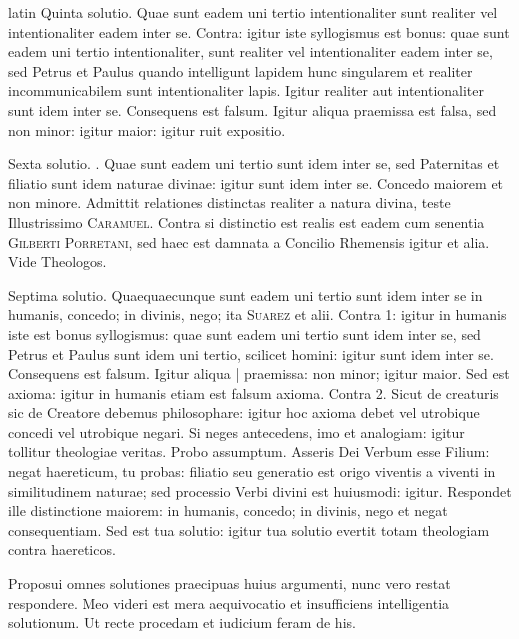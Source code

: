 \begin{otherlanguage*}{latin}
\pstart
 Quinta solutio. Quae sunt eadem uni tertio intentionaliter sunt realiter vel intentionaliter eadem inter se. Contra: igitur iste syllogismus est bonus: quae sunt eadem uni tertio intentionaliter, sunt realiter vel intentionaliter eadem inter se, sed Petrus et Paulus quando intelligunt lapidem hunc singularem et realiter incommunicabilem sunt intentionaliter lapis. Igitur realiter aut intentionaliter sunt idem inter se. Consequens est falsum. Igitur aliqua praemissa est falsa, sed non minor: igitur maior: igitur ruit expositio. 
\pend

\pstart
 Sexta solutio. . Quae sunt eadem uni tertio sunt idem inter se, sed Paternitas et filiatio sunt idem naturae divinae: igitur sunt idem inter se. Concedo maiorem et non minore. Admittit relationes distinctas realiter a natura divina, teste Illustrissimo \textsc{Caramuel}. Contra si distinctio est realis est eadem cum senentia \textsc{Gilberti Porretani}, sed haec est damnata a Concilio Rhemensis igitur et alia. Vide Theologos. 
\pend

\pstart
 Septima solutio. Quaequaecunque sunt eadem uni tertio sunt idem inter se in humanis, concedo; in divinis, nego; ita \textsc{Suarez} et alii. Contra 1: igitur in humanis iste est bonus syllogismus: quae sunt eadem uni tertio sunt idem inter se, sed Petrus et Paulus sunt idem uni tertio, scilicet homini: igitur sunt idem inter se. Consequens est falsum. Igitur aliqua \textnormal{|} praemissa: non minor; igitur maior. Sed est axioma: igitur in humanis etiam est falsum axioma. Contra 2. Sicut de creaturis sic de Creatore debemus philosophare: igitur hoc axioma debet vel utrobique concedi vel utrobique negari. Si neges antecedens, imo et analogiam: igitur tollitur theologiae veritas. Probo assumptum. Asseris Dei Verbum esse Filium: negat haereticum, tu probas: filiatio seu generatio est origo viventis a viventi in similitudinem naturae; sed processio Verbi divini est huiusmodi: igitur. Respondet ille distinctione maiorem: in humanis, concedo; in divinis, nego et negat consequentiam. Sed est tua solutio: igitur tua solutio evertit totam theologiam contra haereticos. 
\pend

\pstart
 Proposui omnes solutiones praecipuas huius argumenti, nunc vero restat respondere. Meo videri est mera aequivocatio et insufficiens intelligentia solutionum. Ut recte procedam et iudicium feram de his. 
\pend


\end{otherlanguage*}
